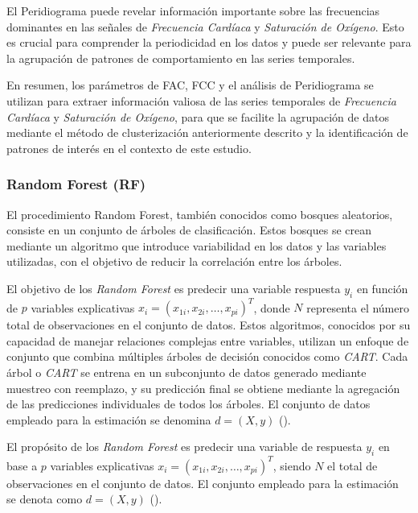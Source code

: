 El Peridiograma puede revelar información importante sobre las frecuencias dominantes en las señales de \textit{Frecuencia Cardíaca} y \textit{Saturación de Oxígeno}. Esto es crucial para comprender la periodicidad en los datos y puede ser relevante para la agrupación de patrones de comportamiento en las series temporales.

En resumen, los parámetros de FAC, FCC y el análisis de Peridiograma se utilizan para extraer información valiosa de las series temporales de \textit{Frecuencia Cardíaca} y \textit{Saturación de Oxígeno}, para que se facilite la agrupación de datos mediante el método de clusterización anteriormente descrito y la identificación de patrones de interés en el contexto de este estudio.


\subsubsection{Random Forest (RF)}\label{sec:rf}

El procedimiento Random Forest, también conocidos como bosques aleatorios, consiste en un conjunto de árboles de clasificación. Estos bosques se crean mediante un algoritmo que introduce variabilidad en los datos y las variables utilizadas, con el objetivo de reducir la correlación entre los árboles.


El objetivo de los \textit{Random Forest} es predecir una variable respuesta \(y_i\) en función de \(p\) variables explicativas \(x_i = (x_{1i}, x_{2i}, \ldots, x_{pi})^T\), donde \(N\) representa el número total de observaciones en el conjunto de datos. Estos algoritmos, conocidos por su capacidad de manejar relaciones complejas entre variables, utilizan un enfoque de conjunto que combina múltiples árboles de decisión conocidos como \textit{CART}. Cada árbol o \textit{CART} se entrena en un subconjunto de datos generado mediante muestreo con reemplazo, y su predicción final se obtiene mediante la agregación de las predicciones individuales de todos los árboles. El conjunto de datos empleado para la estimación se denomina \(d = (X, y)\) (\cite{ho1995random}).


El propósito de los \textit{Random Forest} es predecir una variable de respuesta \(y_i\) en base a \(p\) variables explicativas \(x_i = (x_{1i}, x_{2i}, \ldots, x_{pi})^T\), siendo \(N\) el total de observaciones en el conjunto de datos. El conjunto empleado para la estimación se denota como \(d = (X, y)\) (\cite{ho1995random}).



